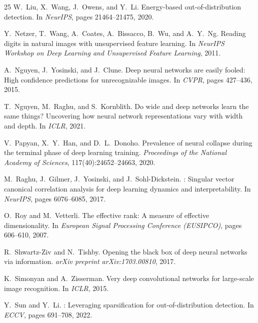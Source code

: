 \documentclass{article}
\begin{document}
\begin{thebibliography}{25}
W.~Liu, X.~Wang, J.~Owens, and Y.~Li.
\newblock Energy-based out-of-distribution detection.
\newblock In \emph{NeurIPS}, pages 21464--21475, 2020.

Y.~Netzer, T.~Wang, A.~Coates, A.~Bissacco, B.~Wu, and A.~Y.~Ng.
\newblock Reading digits in natural images with unsupervised feature learning.
\newblock In \emph{NeurIPS Workshop on Deep Learning and Unsupervised Feature Learning}, 2011.

A.~Nguyen, J.~Yosinski, and J.~Clune.
\newblock Deep neural networks are easily fooled: High confidence predictions for unrecognizable images.
\newblock In \emph{CVPR}, pages 427--436, 2015.

T.~Nguyen, M.~Raghu, and S.~Kornblith.
\newblock Do wide and deep networks learn the same things? Uncovering how neural network representations vary with width and depth.
\newblock In \emph{ICLR}, 2021.

V.~Papyan, X.~Y.~Han, and D.~L.~Donoho.
\newblock Prevalence of neural collapse during the terminal phase of deep learning training.
\newblock \emph{Proceedings of the National Academy of Sciences}, 117(40):24652--24663, 2020.

M.~Raghu, J.~Gilmer, J.~Yosinski, and J.~Sohl-Dickstein.
: Singular vector canonical correlation analysis for deep learning dynamics and interpretability.
\newblock In \emph{NeurIPS}, pages 6076--6085, 2017.

O.~Roy and M.~Vetterli.
\newblock The effective rank: A measure of effective dimensionality.
\newblock In \emph{European Signal Processing Conference (EUSIPCO)}, pages 606--610, 2007.

R.~Shwartz-Ziv and N.~Tishby.
\newblock Opening the black box of deep neural networks via information.
\newblock \emph{arXiv preprint arXiv:1703.00810}, 2017.

K.~Simonyan and A.~Zisserman.
\newblock Very deep convolutional networks for large-scale image recognition.
\newblock In \emph{ICLR}, 2015.

Y.~Sun and Y.~Li.
: Leveraging sparsification for out-of-distribution detection.
\newblock In \emph{ECCV}, pages 691--708, 2022.


\end{thebibliography}
\end{document}
